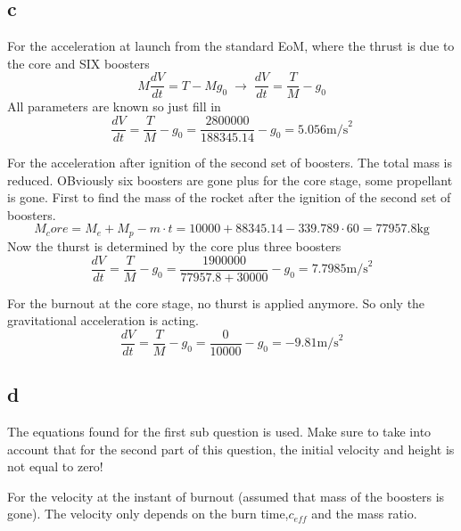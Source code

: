 \subsection{c}
For the acceleration at launch from the standard EoM, where the thrust is due to the core and SIX boosters
\begin{equation}
M\frac{dV}{dt}=T-Mg_0\;\rightarrow\; \frac{dV}{dt} = \frac{T}{M}-g_0
\end{equation}
All parameters are known so just fill in
\begin{equation}
\frac{dV}{dt} = \frac{T}{M}-g_0 = \frac{2800000}{188345.14}-g_0=5.056\text{m/s}^2
\end{equation}

For the acceleration after ignition of the second set of boosters. The total mass is reduced. OBviously six boosters are gone plus for the core stage, some propellant is gone.
First to find the mass of the rocket after the ignition of the second set of boosters.
\begin{equation}
M_core = M_e+M_p-m\cdot t=10000+88345.14-339.789\cdot60=77957.8\text{kg}
\end{equation}
Now the thurst is determined by the core plus three boosters
\begin{equation}
\frac{dV}{dt} = \frac{T}{M}-g_0 = \frac{1900000}{77957.8+30000}-g_0=7.7985\text{m/s}^2
\end{equation}

For the burnout at the core stage, no thurst is applied anymore. So only the gravitational acceleration is acting.
\begin{equation}
\frac{dV}{dt} = \frac{T}{M}-g_0 = \frac{0}{10000}-g_0=-9.81\text{m/s}^2
\end{equation}

\subsection{d}
The equations found for the first sub question is used. Make sure to take into account that for the second part of this question, the initial velocity and height is not equal to zero!

For the velocity at the instant of burnout (assumed that mass of the boosters is gone). The velocity only depends on the burn time,$c_{eff}$ and the mass ratio.

